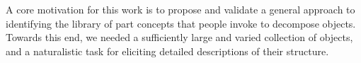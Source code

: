 




A core motivation for this work is to propose and validate a general approach to identifying the library of part concepts that people invoke to decompose objects.
Towards this end, we needed a sufficiently large and varied collection of objects, and a naturalistic task for eliciting detailed descriptions of their structure. 


